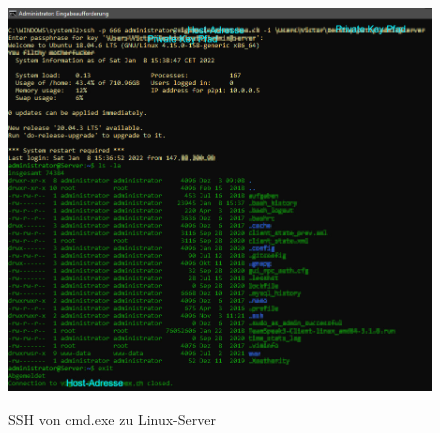 \begin{figure}[H]
    \begin{center}
    \label{pic:SSH}
    \includegraphics[width=\textwidth]{images/ssh.jpg}
    \caption{SSH von cmd.exe zu Linux-Server}
    \end{center}
\end{figure}

